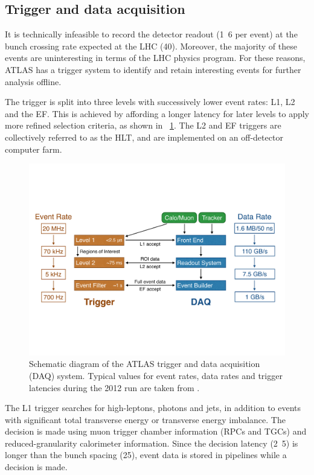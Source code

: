 \subsection{Trigger and data acquisition}
\label{sec:atlas:trig}

It is technically infeasible to record the detector readout (\unit{1.6}{\mega\bel} per 
event) at the bunch crossing rate expected at the \ac{LHC} (\unit{40}{\mega\hertz}).
Moreover, the majority of these events are uninteresting in terms of the \ac{LHC} physics 
program. For these reasons, ATLAS has a trigger system to identify and retain interesting
events for further analysis offline.

The trigger is split into three levels with successively lower event rates: \ac{L1}, 
\ac{L2} and the \ac{EF}. This is achieved by affording a longer latency for later levels 
to apply more refined selection criteria, as shown in \Figure~\ref{fig:trigger}. The 
\ac{L2} and \ac{EF} triggers are collectively referred to as the \ac{HLT}, and are 
implemented on an off-detector computer farm.

\begin{figure}
	\includegraphics[width=\textwidth,clip=true,trim=0.9cm 6.8cm 1.4cm 6.8cm]{custom_images/trigger}
	\caption{Schematic diagram of the ATLAS trigger and data acquisition (DAQ) system.
	Typical values for event rates, data rates and trigger latencies during the 2012 run 
	are taken from \cite{TriggerNumbers}.}
	\label{fig:trigger}
\end{figure}

The \ac{L1} trigger searches for high-\pt leptons, photons and jets, in addition to 
events with significant total transverse energy or transverse energy imbalance. The 
decision is made using muon trigger chamber information (\acp{RPC} and \acp{TGC}) and 
reduced-granularity calorimeter information. Since the decision latency 
(\unit{2.5}{\micro\second}) is longer than the bunch spacing (\unit{25}{\nano\second}),
event data is stored in pipelines while a decision is made.

